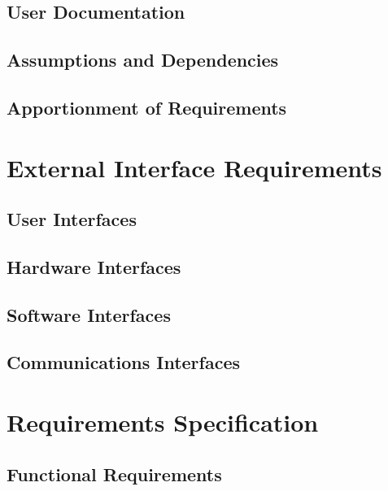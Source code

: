 \documentclass[11pt]{article}
\begin{document}
\subsection{User Documentation}
\label{sec:documentation}

\subsection{Assumptions and Dependencies}
\label{sec:assumptions}

\subsection{Apportionment of Requirements}
\label{sec:apportionment}

\section{External Interface Requirements}
\label{sec:external}

\subsection{User Interfaces}
\label{sec:user}

\subsection{Hardware Interfaces}
\label{sec:hardware}

\subsection{Software Interfaces}
\label{sec:software}

\subsection{Communications Interfaces}
\label{sec:communications}

\section{Requirements Specification}
\label{sec:specification}

\subsection{Functional Requirements}
\label{sec:functional}
\end{document}

